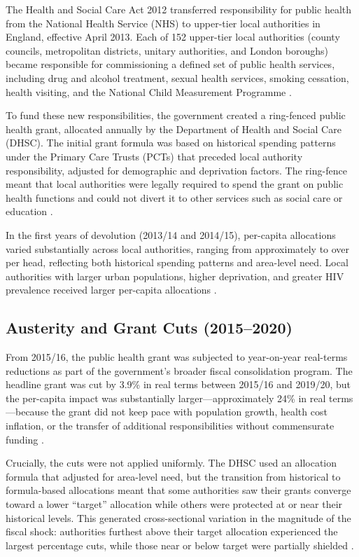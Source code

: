 \documentclass[12pt]{article}
\begin{document}
The Health and Social Care Act 2012 transferred responsibility for public health from the National Health Service (NHS) to upper-tier local authorities in England, effective April 2013. Each of 152 upper-tier local authorities (county councils, metropolitan districts, unitary authorities, and London boroughs) became responsible for commissioning a defined set of public health services, including drug and alcohol treatment, sexual health services, smoking cessation, health visiting, and the National Child Measurement Programme \citep{healthact2012}.

To fund these new responsibilities, the government created a ring-fenced public health grant, allocated annually by the Department of Health and Social Care (DHSC). The initial grant formula was based on historical spending patterns under the Primary Care Trusts (PCTs) that preceded local authority responsibility, adjusted for demographic and deprivation factors. The ring-fence meant that local authorities were legally required to spend the grant on public health functions and could not divert it to other services such as social care or education \citep{dhsc2021}.

In the first years of devolution (2013/14 and 2014/15), per-capita allocations varied substantially across local authorities, ranging from approximately  to over  per head, reflecting both historical spending patterns and area-level need. Local authorities with larger urban populations, higher deprivation, and greater HIV prevalence received larger per-capita allocations \citep{kingsfund2014}.

\subsection{Austerity and Grant Cuts (2015--2020)}

From 2015/16, the public health grant was subjected to year-on-year real-terms reductions as part of the government's broader fiscal consolidation program. The headline grant was cut by 3.9\% in real terms between 2015/16 and 2019/20, but the per-capita impact was substantially larger---approximately 24\% in real terms---because the grant did not keep pace with population growth, health cost inflation, or the transfer of additional responsibilities without commensurate funding \citep{healthfoundation2019}.

Crucially, the cuts were not applied uniformly. The DHSC used an allocation formula that adjusted for area-level need, but the transition from historical to formula-based allocations meant that some authorities saw their grants converge toward a lower ``target'' allocation while others were protected at or near their historical levels. This generated cross-sectional variation in the magnitude of the fiscal shock: authorities furthest above their target allocation experienced the largest percentage cuts, while those near or below target were partially shielded \citep{kingsfund2023}.
\end{document}
